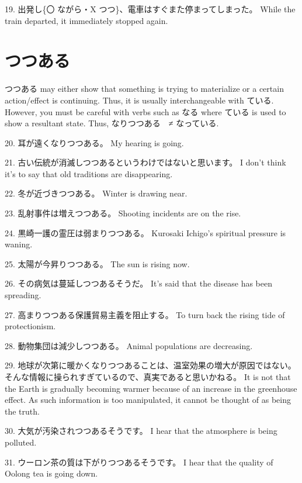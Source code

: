 \par{19. 出発し\{〇 ながら・X つつ\}、電車はすぐまた停まってしまった。 \hfill\break
While the train departed, it immediately stopped again. }
      
\section{つつある}
 
\par{ つつある may either show that something is trying to materialize or a certain action\slash effect is continuing. Thus, it is usually interchangeable with ている. However, you must be careful with verbs such as なる where ている is used to show a resultant state. Thus, なりつつある　≠ なっている. }

\par{20. 耳が遠くなりつつある。 \hfill\break
My hearing is going. }

\par{21. 古い伝統が消滅しつつあるというわけではないと思います。 \hfill\break
I don't think it's to say that old traditions are disappearing. }

\par{22. 冬が近づきつつある。 \hfill\break
Winter is drawing near. }

\par{23. 乱射事件は増えつつある。 \hfill\break
Shooting incidents are on the rise. }

\par{24. 黒崎一護の霊圧は弱まりつつある。 \hfill\break
Kurosaki Ichigo's spiritual pressure is waning. }

\par{25. 太陽が今昇りつつある。 \hfill\break
The sun is rising now. }

\par{26. その病気は蔓延しつつあるそうだ。 \hfill\break
It's said that the disease has been spreading. }

\par{27. 高まりつつある保護貿易主義を阻止する。 \hfill\break
To turn back the rising tide of protectionism. }

\par{28. 動物集団は減少しつつある。 \hfill\break
Animal populations are decreasing. }

\par{29. 地球が次第に暖かくなりつつあることは、温室効果の増大が原因ではない。そんな情報に操られすぎているので、真実であると思いかねる。 \hfill\break
It is not that the Earth is gradually becoming warmer because of an increase in the greenhouse effect. As such information is too manipulated, it cannot be thought of as being the truth. }

\par{30. 大気が汚染されつつあるそうです。 \hfill\break
I hear that the atmosphere is being polluted. }

\par{31. ウーロン茶の質は下がりつつあるそうです。 \hfill\break
I hear that the quality of Oolong tea is going down. }
    